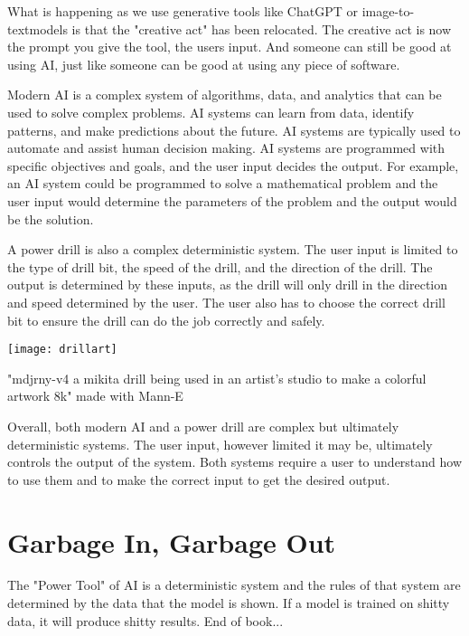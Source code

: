 What is happening as we use generative tools like ChatGPT or image-to-textmodels is that the "creative act" has been relocated. The creative act is now the prompt you give the tool, the users input. And someone can still be good at using AI, just like someone can be good at using any piece of software.

Modern AI is a complex system of algorithms, data, and analytics that can be used to solve complex problems. AI systems can learn from data, identify patterns, and make predictions about the future. AI systems are typically used to automate and assist human decision making. AI systems are programmed with specific objectives and goals, and the user input decides the output. For example, an AI system could be programmed to solve a mathematical problem and the user input would determine the parameters of the problem and the output would be the solution.

A power drill is also a complex deterministic system. The user input is limited to the type of drill bit, the speed of the drill, and the direction of the drill. The output is determined by these inputs, as the drill will only drill in the direction and speed determined by the user. The user also has to choose the correct drill bit to ensure the drill can do the job correctly and safely.

\begin{marginfigure}[-5.5cm]
        \texttt{[image: drillart]}
        \caption{"mdjrny-v4 a mikita drill being used in an artist's studio to make a colorful artwork 8k" made with Mann-E}
\end{marginfigure}

Overall, both modern AI and a power drill are complex but ultimately deterministic systems. The user input, however limited it may be, ultimately controls the output of the system. Both systems require a user to understand how to use them and to make the correct input to get the desired output.

\section{Garbage In, Garbage Out}

The "Power Tool" of AI is a deterministic  system and the rules of that system are determined by the data that the model is shown. If a model is trained on shitty data, it will produce shitty results. End of book...

